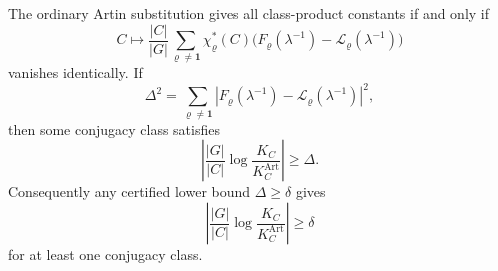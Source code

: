 \begin{corollary}
  The ordinary Artin substitution gives all class-product constants if and
  only if
  \begin{equation}\label{eq:adams-obstruction-class-function}
    C\longmapsto
    \frac{|C|}{|G|}
    \sum_{\varrho\ne\mathbf1}\chi_\varrho^\ast(C)
    \bigl(F_\varrho(\lambda^{-1})
      -\mathcal L_\varrho(\lambda^{-1})\bigr)
  \end{equation}
  vanishes identically.  If
  \[
    \Delta^2=\sum_{\varrho\ne\mathbf1}
      |F_\varrho(\lambda^{-1})-\mathcal L_\varrho(\lambda^{-1})|^2,
  \]
  then some conjugacy class satisfies
  \begin{equation}\label{eq:adams-obstruction-bound-sup-lower-bound}
    \left|
      \frac{|G|}{|C|}
      \log\frac{K_C}{K_C^{\mathrm{Art}}}
    \right|\ge\Delta .
  \end{equation}
  Consequently any certified lower bound \(\Delta\ge\delta\) gives
  \begin{equation}\label{eq:adams-obstruction-bound-lower-bound}
    \left|
      \frac{|G|}{|C|}
      \log\frac{K_C}{K_C^{\mathrm{Art}}}
    \right|\ge\delta
  \end{equation}
  for at least one conjugacy class.
\end{corollary}

